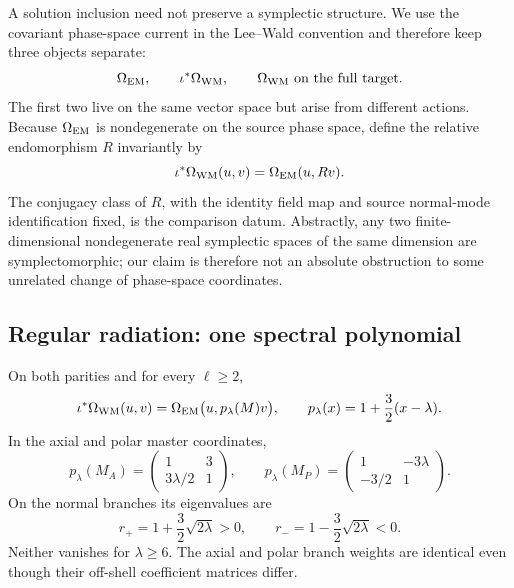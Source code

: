 \documentclass[11pt]{article}
\theoremstyle{remark}
\begin{document}
A solution inclusion need not preserve a symplectic structure. We use the
covariant phase-space current in the Lee--Wald convention
\cite{LeeWald,IyerWald} and therefore
keep three objects separate:
\begin{equation}
 \Omega_{\rm EM},\qquad \iota^*\Omega_{\rm WM},\qquad
 \Omega_{\rm WM}\ \hbox{on the full target}.
\end{equation}
The first two live on the same vector space but arise from different actions.
Because $\Omega_{\rm EM}$ is nondegenerate on the source phase space, define
the relative endomorphism $R$ invariantly by
\begin{equation}\label{eq:relative-endomorphism}
 \iota^*\Omega_{\rm WM}(u,v)=\Omega_{\rm EM}(u,Rv).
\end{equation}
The conjugacy class of $R$, with the identity field map and source
normal-mode identification fixed, is the comparison datum. Abstractly, any
two finite-dimensional nondegenerate real symplectic spaces of the same
dimension are symplectomorphic; our claim is therefore not an absolute
obstruction to some unrelated change of phase-space coordinates.

\subsection{Regular radiation: one spectral polynomial}
On both parities and for every $\ell\geq2$,
\begin{equation}\label{eq:spectral-identity}
 \iota^*\Omega_{\rm WM}(u,v)
 =\Omega_{\rm EM}\bigl(u,p_\lambda(M)v\bigr),
 \qquad p_\lambda(x)=1+\frac32(x-\lambda).
\end{equation}
In the axial and polar master coordinates,
\begin{equation}
 p_\lambda(M_A)=
 \begin{pmatrix}1&3\\3\lambda/2&1\end{pmatrix},\qquad
 p_\lambda(M_P)=
 \begin{pmatrix}1&-3\lambda\\-3/2&1\end{pmatrix}.
\end{equation}
On the normal branches its eigenvalues are
\begin{equation}\label{eq:relative-weights}
 r_+=1+\frac32\sqrt{2\lambda}>0,\qquad
 r_-=1-\frac32\sqrt{2\lambda}<0.
\end{equation}
Neither vanishes for $\lambda\geq6$. The axial and polar branch weights are
identical even though their off-shell coefficient matrices differ.
\end{document}
